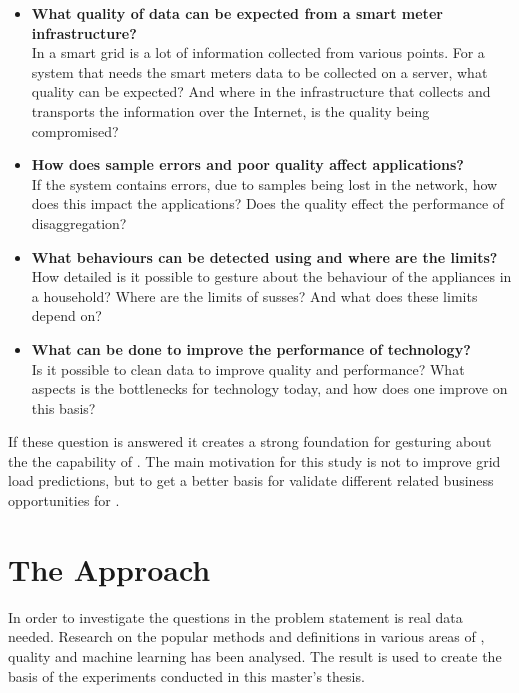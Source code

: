 \begin{itemize}
\item	\textbf{What quality of data can be expected from a smart meter infrastructure?}\\
In a smart grid is a lot of information collected from various points. For a system that needs the smart meters data to be collected on a server, what quality can be expected? And where in the infrastructure that collects and transports the information over the Internet, is the quality being compromised? \\
	
	
\item	\textbf{How does sample errors and poor quality affect  applications?}\\
If the system contains errors, due to samples being lost in the network, how does this impact the  applications?  Does the quality effect the performance of  disaggregation? \\
	
\item	\textbf{What behaviours can be detected using  and where are the limits?} \\
How detailed is it possible to gesture about the behaviour of the appliances in a household? Where are the limits of susses? And what does these limits depend on?  \\
	
\item	\textbf{What can be done to improve the performance of  technology?}\\
Is it possible to clean data to improve quality and performance? What aspects is the bottlenecks for  technology today, and how does one improve on this basis? \\

\end{itemize}
If these question is answered it creates a strong foundation for gesturing about the the capability of . The main motivation for this study is not to improve grid load predictions, but to get a better basis for validate different  related business opportunities for .

\section{The Approach}
In order to investigate the questions in the problem statement is real data needed. Research on the popular methods and definitions in various areas of , quality and machine learning has been analysed. The result is used to create the basis of the experiments conducted in this master's thesis. 

